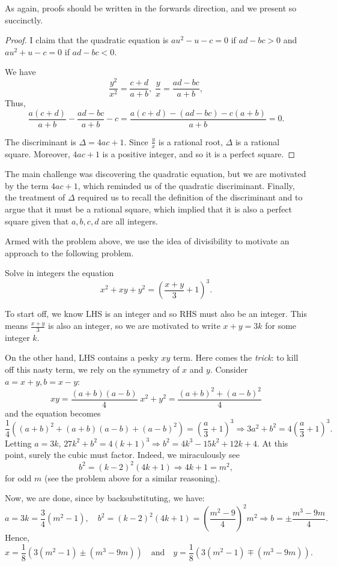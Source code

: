 \documentclass[../main.tex]{subfiles}
\begin{document}
As again, proofs should be written in the forwards direction, and we present so succinctly.
\begin{proof}
I claim that the quadratic equation is $au^2-u-c=0$ if $ad-bc > 0$ and $au^2+u-c=0$ if $ad-bc < 0$.

We have $$\frac{y^2}{x^2}=\frac{c+d}{a+b}, \; \frac{y}{x}=\frac{ad-bc}{a+b},$$
Thus, $$\frac{a(c+d)}{a+b}-\frac{ad-bc}{a+b}-c=\frac{a(c+d)-(ad-bc)-c(a+b)}{a+b}=0.$$

The discriminant is $\Delta=4ac+1$. Since $\frac{y}{x}$ is a rational root, $\Delta$ is a rational square. Moreover, $4ac+1$ is a positive integer, and so it is a perfect square.
\end{proof}
\begin{moral}
The main challenge was discovering the quadratic equation, but we are motivated by the term $4ac+1$, which reminded us of the quadratic discriminant. Finally, the treatment of $\Delta$ required us to recall the definition of the discriminant and to argue that it must be a rational square, which implied that it is also a perfect square given that $a,b,c,d$ are all integers.
\end{moral}

Armed with the problem above, we use the idea of divisibility to motivate an approach to the following problem.
\begin{example}
Solve in integers the equation
$$x^2+xy+y^2=\left(\frac{x+y}{3}+1\right)^3.$$
\end{example}
To start off, we know LHS is an integer and so RHS must also be an integer. This means $\frac{x+y}{3}$ is also an integer, so we are motivated to write $x+y=3k$ for some integer $k$.

On the other hand, LHS contains a pesky $xy$ term. Here comes the \textit{trick}: to kill off this nasty term, we rely on the symmetry of $x$ and $y$. Consider $a=x+y, b=x-y$:
    $$xy= \frac{(a+b)(a-b)}{4}\;x^2+y^2= \frac{(a+b)^2+(a-b)^2}{4}$$
and the equation becomes
$$\frac{1}{4}\left((a+b)^2+(a+b)(a-b)+(a-b)^2\right)=\left(\frac{a}{3}+1\right)^3 \Longrightarrow 3a^2+b^2=4\left(\frac{a}{3}+1\right)^3.$$
Letting $a=3k$, $27k^2+b^2=4(k+1)^3 \Longrightarrow b^2=4k^3-15k^2+12k+4$.
At this point, surely the cubic must factor. Indeed, we miraculously see
$$b^2=(k-2)^2(4k+1) \Longrightarrow 4k+1=m^2,$$
for odd $m$ (see the problem above for a similar reasoning).

Now, we are done, since by backsubstituting, we have:
$$a=3k=\frac{3}{4}(m^2-1), \quad b^2=(k-2)^2(4k+1)=\left(\frac{m^2-9}{4}\right)^2m^2 \Longrightarrow b=\pm \frac{m^3-9m}{4}.$$
Hence,
$$x=\frac{1}{8}\left(3(m^2-1)\pm(m^3-9m)\right)\quad\text{and}\quad y=\frac{1}{8}\left(3(m^2-1)\mp(m^3-9m)\right).$$
\end{document}
